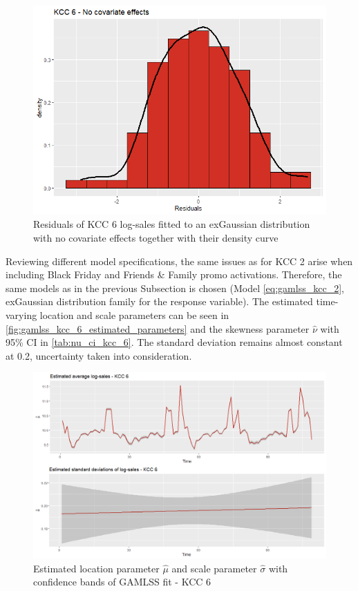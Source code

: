 \begin{figure}[H]
\centering
  \includegraphics[width=0.45\linewidth]{figures/res_kcc_6_no_covariates.png}
  \caption{Residuals of KCC 6 log-sales fitted to an exGaussian distribution with no covariate effects together with their density curve}
  \label{fig:res_kcc_6_no_covariates}
\end{figure}


Reviewing different model specifications, the same issues as for \ac{KCC} 2 arise when including Black Friday and Friends \& Family promo activations. Therefore, the same models as in the previous Subsection is chosen (Model \ref{eq:gamlss_kcc_2}, exGaussian distribution family for the response variable). 
The estimated time-varying location and scale parameters can be seen in \autoref{fig:gamlss_kcc_6_estimated_parameters} and the skewness parameter $\hat{\nu}$ with 95\% CI in \autoref{tab:nu_ci_kcc_6}. The standard deviation remains almost constant at 0.2, uncertainty taken into consideration.
\\





\begin{figure}[H]
\centering
  \includegraphics[width=0.95\linewidth]{figures/gamlss_kcc_6_estimated_parameters.png}
  \caption{Estimated location parameter $\hat{\mu}$ and scale parameter $\hat{\sigma}$ with confidence bands of GAMLSS fit - KCC 6}
  \label{fig:gamlss_kcc_6_estimated_parameters}
\end{figure}



